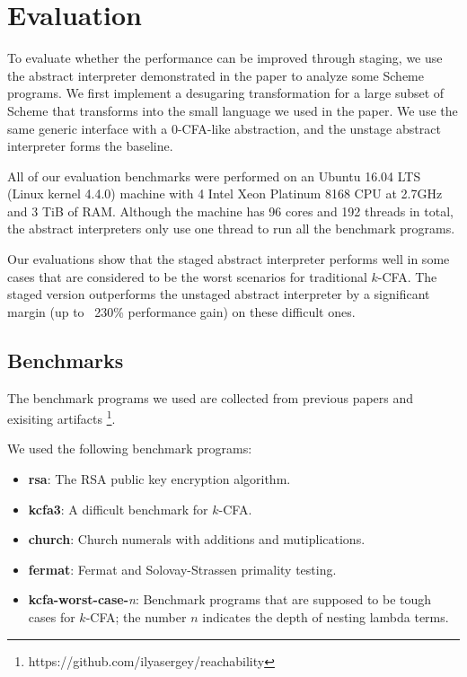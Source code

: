 \section{Evaluation} \label{evaluation}

To evaluate whether the performance can be improved through staging, we use the
abstract interpreter demonstrated in the paper to analyze some Scheme programs.
We first implement a desugaring transformation for a large subset of Scheme that
transforms into the small language we used in the paper. We use the same generic
interface with a 0-CFA-like abstraction, and the unstage abstract interpreter
forms the baseline.

All of our evaluation benchmarks were performed on an Ubuntu 16.04 LTS (Linux
kernel 4.4.0) machine with 4 Intel Xeon Platinum 8168 CPU at 2.7GHz and 3 TiB of
RAM. Although the machine has 96 cores and 192 threads in total, the abstract
interpreters only use one thread to run all the benchmark programs.

Our evaluations show that the staged abstract interpreter performs well in some
cases that are considered to be the worst scenarios for traditional $k$-CFA. The
staged version outperforms the unstaged abstract interpreter by a significant
margin (up to ~230\% performance gain) on these difficult ones.

\subsection{Benchmarks}

The benchmark programs we used are collected from previous papers
\cite{Johnson:2013:OAA:2500365.2500604, ashley:practical,
DBLP:journals/corr/abs-1102-3676} and exisiting artifacts
\footnote{https://github.com/ilyasergey/reachability}.

We used the following benchmark programs:

\begin{itemize}
  \item \textbf{rsa}: The RSA public key encryption algorithm.
  \item \textbf{kcfa3}: A difficult benchmark for $k$-CFA.
  \item \textbf{church}: Church numerals with additions and mutiplications.
  \item \textbf{fermat}: Fermat and Solovay-Strassen primality testing.
  \item \textbf{kcfa-worst-case-}\textit{n}: 
    Benchmark programs that are supposed to be tough cases for $k$-CFA; 
    the number $n$ indicates the depth of nesting lambda terms.
\end{itemize}

